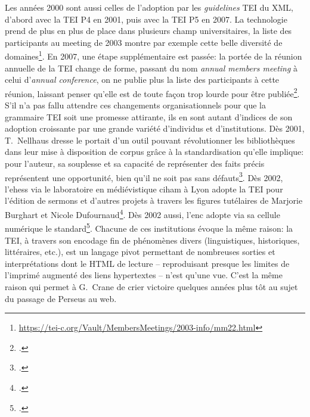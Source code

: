 Les années 2000 sont aussi celles de l'adoption par les \textit{guidelines} TEI du XML, d'abord avec la TEI P4 en 2001, puis avec la TEI P5 en 2007. La technologie prend de plus en plus de place dans plusieurs champ universitaires, la liste des participants au meeting de 2003 montre par exemple cette belle diversité de domaines\footnote{\url{https://tei-c.org/Vault/MembersMeetings/2003-info/mm22.html}}. En 2007, une étape supplémentaire est passée: la portée de la réunion annuelle de la TEI change de forme, passant du nom \textit{annual members meeting} à celui d'\textit{annual conference}, on ne publie plus la liste des participants à cette réunion, laissant penser qu'elle est de toute façon trop lourde pour être publiée\footcite{noauthor_members_nodate}. S'il n'a pas fallu attendre ces changements organisationnels pour que la grammaire TEI soit une promesse attirante, ils en sont autant d'indices de son adoption croissante par une grande variété d'individus et d'institutions. Dès 2001, T.~Nellhaus dresse le portait d'un outil pouvant révolutionner les bibliothèques dans leur mise à disposition de corpus grâce à la standardisation qu'elle implique: pour l'auteur, sa souplesse et sa capacité de représenter des faits précis représentent une opportunité, bien qu'il ne soit pas sans défauts\footcite{nellhaus_xml_2001}. Dès 2002, l'\acrfull{ehess} via le laboratoire en médiévistique  \acrfull{ciham} à Lyon adopte la TEI pour l'édition de sermons et d'autres projets à travers les figures tutélaires de Marjorie Burghart et Nicole Dufournaud\footcite{burghart_edition_2011}. Dès 2002 aussi, l'\acrfull{enc} adopte via sa cellule numérique le standard\footcite{poupeau_les_2006}. Chacune de ces institutions évoque la même raison: la TEI, à travers son encodage fin de phénomènes divers (linguistiques, historiques, littéraires, etc.), est un langage pivot permettant de nombreuses sorties et interprétations dont le HTML de lecture -- reproduisant presque les limites de l'imprimé augmenté des liens hypertextes -- n'est qu'une vue. C'est la même raison qui permet à G.~Crane de crier victoire quelques années plus tôt au sujet du passage de Perseus au web.


